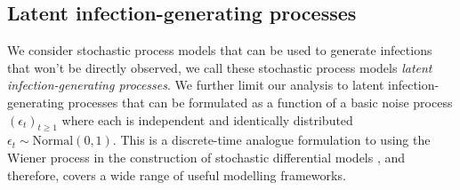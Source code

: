 \documentclass{getwriting}
\begin{document}
\subsection{Latent infection-generating processes}
We consider stochastic process models that can be used to generate infections that won't be directly observed, we call these stochastic process models \textit{latent infection-generating processes}. We further limit our analysis to latent infection-generating processes that can be formulated as a function of a basic noise process $(\epsilon_t)_{t\geq 1}$ where each is independent and identically distributed $\epsilon_t \sim \text{Normal}(0,1)$. This is a discrete-time analogue formulation to using the Wiener process in the construction of stochastic differential models \cite{oksendal2013stochastic}, and therefore, covers a wide range of useful modelling frameworks. 
\end{document}
